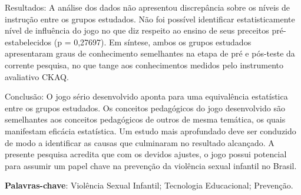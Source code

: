 \begin{resumo}
  Resultados: A análise dos dados não apresentou discrepância sobre os níveis de instrução entre os grupos estudados. Não foi possível identificar estatisticamente nível de influência do jogo no que diz respeito ao ensino de seus preceitos pré-estabelecidos (p = 0,27697). Em síntese, ambos os grupos estudados apresentaram graus de conhecimento semelhantes na etapa de pré e pós-teste da corrente pesquisa, no que tange aos conhecimentos medidos pelo instrumento avaliativo \ac{CKAQ}.

  Conclusão: O jogo sério desenvolvido aponta para uma equivalência estatística entre os grupos estudados. Os conceitos pedagógicos do jogo desenvolvido são semelhantes aos conceitos pedagógicos de outros de mesma temática, os quais manifestam eficácia estatística. Um estudo mais aprofundado deve ser conduzido de modo a identificar as causas que culminaram no resultado alcançado. A presente pesquisa acredita que com os devidos ajustes, o jogo possui potencial para assumir um papel chave na prevenção da violência sexual infantil no Brasil.
 

   
 \textbf{Palavras-chave}: Violência Sexual Infantil; Tecnologia Educacional; Prevenção.
\end{resumo}
